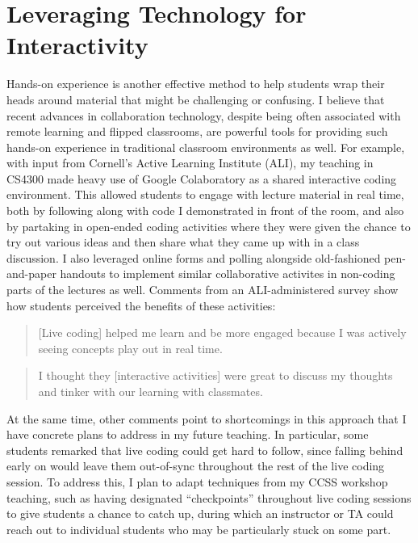 \documentclass[12pt,letterpaper]{article}
\newcommand\interactionimprove\lainteractionend
\newcommand\interactionimprove\geninteractionend
\begin{document}
\section{Leveraging Technology for Interactivity}
Hands-on experience is another effective method to help students wrap their heads around material that might be challenging or confusing.
I believe that recent advances in collaboration technology, despite being often associated with remote learning and flipped classrooms, are powerful tools for providing such hands-on experience in traditional classroom environments as well.
For example, with input from Cornell's Active Learning Institute (ALI), my teaching in CS4300 made heavy use of Google Colaboratory as a shared interactive coding environment.
This allowed students to engage with lecture material in real time, both by following along with code I demonstrated in front of the room, and also by partaking in open-ended coding activities where they were given the chance to try out various ideas and then share what they came up with in a class discussion.
I also leveraged online forms and polling alongside old-fashioned pen-and-paper handouts to implement similar collaborative activites in non-coding parts of the lectures as well.
Comments from an ALI-administered survey show how students perceived the benefits of these activities:

\begin{quote}
    [Live coding] helped me learn and be more engaged because I was actively seeing concepts play out in real time.
\end{quote}
\begin{quote}
    I thought they [interactive activities] were great to discuss my thoughts and tinker with our learning with classmates.
\end{quote}

At the same time, other comments point to shortcomings in this approach that I have concrete plans to address in my future teaching.
In particular, some students remarked that live coding could get hard to follow, since falling behind early on would leave them out-of-sync throughout the rest of the live coding session.
To address this, I plan to adapt techniques from my CCSS workshop teaching, such as having designated ``checkpoints'' throughout live coding sessions to give students a chance to catch up, during which an instructor
\ifliberalarts
%
\else
or TA
\fi
could reach out to individual students who may be particularly stuck on some part.
\interactionimprove
\end{document}

